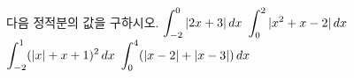 다음 정적분의 값을 구하시오.
 $\displaystyle\int_{-2}^{0}|2x+3|\mkern3mu dx$
 $\displaystyle\int_{0}^{2}|x^2+x-2|\mkern3mu dx$
 $\displaystyle\int_{-2}^{1}(|x|+x+1)^2\mkern3mu dx$
 $\displaystyle\int_{0}^{4}(|x-2|+|x-3|)\mkern3mu dx$
